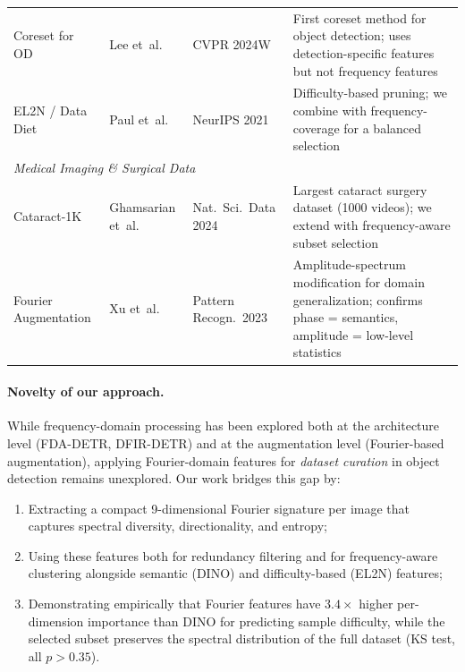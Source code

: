 \begin{table}[t]
\begin{tabular}{p{3.2cm}p{2.5cm}p{3cm}p{5.5cm}}
\quad Coreset for OD
    & Lee et~al.
    & CVPR 2024W
    & First coreset method for object detection; uses detection-specific
      features but not frequency features \\[3pt]
\quad EL2N / Data Diet
    & Paul et~al.
    & NeurIPS 2021
    & Difficulty-based pruning; we combine with frequency-coverage for
      a balanced selection \\[3pt]
\midrule
\multicolumn{4}{l}{\textit{Medical Imaging \& Surgical Data}} \\
\quad Cataract-1K
    & Ghamsarian et~al.
    & Nat.\ Sci.\ Data 2024
    & Largest cataract surgery dataset (1000 videos); we extend with
      frequency-aware subset selection \\[3pt]
\quad Fourier Augmentation
    & Xu et~al.
    & Pattern Recogn.\ 2023
    & Amplitude-spectrum modification for domain generalization;
      confirms phase = semantics, amplitude = low-level statistics \\
\bottomrule
\end{tabular}
\end{table}

\paragraph{Novelty of our approach.}
While frequency-domain processing has been explored both at the architecture
level (FDA-DETR, DFIR-DETR) and at the augmentation level (Fourier-based
augmentation), applying Fourier-domain features for \emph{dataset curation} in
object detection remains unexplored.  Our work bridges this gap by:
\begin{enumerate}
    \item Extracting a compact 9-dimensional Fourier signature per image that
          captures spectral diversity, directionality, and entropy;
    \item Using these features both for redundancy filtering and for
          frequency-aware clustering alongside semantic (DINO) and
          difficulty-based (EL2N) features;
    \item Demonstrating empirically that Fourier features have $3.4\times$
          higher per-dimension importance than DINO for predicting sample
          difficulty, while the selected subset preserves the spectral
          distribution of the full dataset (KS test, all $p > 0.35$).
\end{enumerate}


